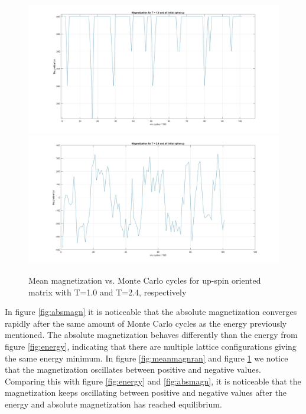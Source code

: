 \documentclass[10pt,a4paper]{article}
\begin{document}
\begin{figure}[H]
\centerline{
\includegraphics[scale=0.15]{magnetizationT1upspin}
\includegraphics[scale=0.15]{magnetizationT24upspin}
}
\caption{Mean magnetization vs. Monte Carlo cycles for up-spin oriented matrix with T=1.0 and T=2.4, respectively}
\label{fig:meanmagnup}
\end{figure}

\noindent In figure \ref{fig:absmagn} it is noticeable that the absolute magnetization converges rapidly after the same amount of Monte Carlo cycles as the energy previously mentioned. The absolute magnetization behaves differently than the energy from figure \ref{fig:energy}, indicating that there are multiple lattice configurations giving the same energy minimum.
In figure \ref{fig:meanmagnran} and figure \ref{fig:meanmagnup} we notice that the magnetization oscillates between positive and negative values. Comparing this with figure \ref{fig:energy} and \ref{fig:absmagn}, it is noticeable that the magnetization keeps oscillating between positive and negative values after the energy and absolute magnetization has reached equilibrium.\\
\end{document}
